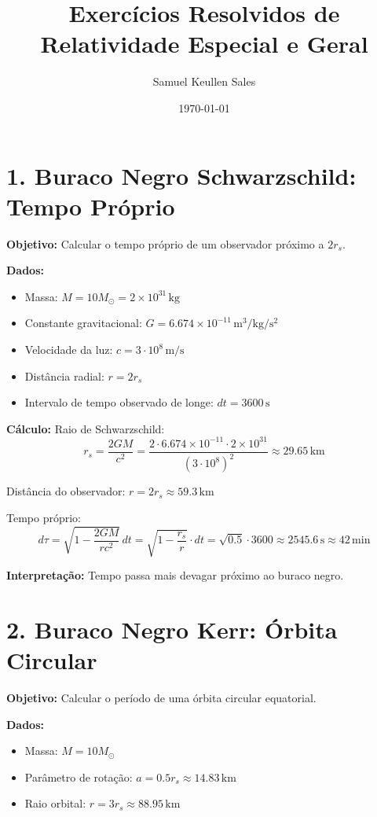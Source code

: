 \documentclass[12pt]{article}
\title{Exercícios Resolvidos de Relatividade Especial e Geral}
\author{Samuel Keullen Sales}
\date{\today}
\begin{document}
\maketitle

\section*{1. Buraco Negro Schwarzschild: Tempo Próprio}

\textbf{Objetivo:} Calcular o tempo próprio de um observador próximo a \(2 r_s\).

\textbf{Dados:} 
\begin{itemize}
    \item Massa: \(M = 10 M_\odot = 2 \times 10^{31}\,\mathrm{kg}\)
    \item Constante gravitacional: \(G = 6.674 \times 10^{-11}\,\mathrm{m^3/kg/s^2}\)
    \item Velocidade da luz: \(c = 3 \cdot 10^8\,\mathrm{m/s}\)
    \item Distância radial: \(r = 2 r_s\)
    \item Intervalo de tempo observado de longe: \(dt = 3600\,\mathrm{s}\)
\end{itemize}

\textbf{Cálculo:}  
Raio de Schwarzschild:  
\[
r_s = \frac{2GM}{c^2} = \frac{2 \cdot 6.674 \times 10^{-11} \cdot 2 \times 10^{31}}{(3 \cdot 10^8)^2} \approx 29.65\,\mathrm{km}
\]

Distância do observador: \(r = 2 r_s \approx 59.3\,\mathrm{km}\)

Tempo próprio:  
\[
d\tau = \sqrt{1 - \frac{2GM}{rc^2}} \, dt = \sqrt{1 - \frac{r_s}{r}} \cdot dt = \sqrt{0.5} \cdot 3600 \approx 2545.6\,\mathrm{s} \approx 42\,\mathrm{min}
\]

\textbf{Interpretação:} Tempo passa mais devagar próximo ao buraco negro.

\section*{2. Buraco Negro Kerr: Órbita Circular}

\textbf{Objetivo:} Calcular o período de uma órbita circular equatorial.

\textbf{Dados:} 
\begin{itemize}
    \item Massa: \(M = 10 M_\odot\)
    \item Parâmetro de rotação: \(a = 0.5 r_s \approx 14.83\,\mathrm{km}\)
    \item Raio orbital: \(r = 3 r_s \approx 88.95\,\mathrm{km}\)
\end{itemize}
\end{document}
